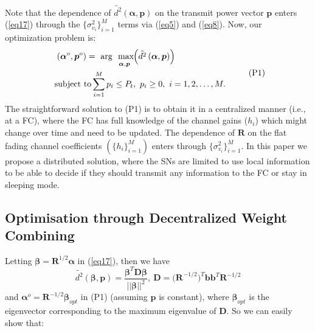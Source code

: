 \documentclass[conference]{IEEEtran}
\begin{document}
Note that the dependence of $\tilde{d^{2}}\left(\boldsymbol\alpha, \boldsymbol p \right)$ on the transmit power vector $\boldsymbol p$ enters (\ref{eq17}) through the $\displaystyle \big \{ \sigma^{2}_{v_i}\big \}_{i=1}^{M}$ terms via (\ref{eq5}) and (\ref{eq8}). 
Now, our optimization problem is:
\begin{equation*}\label{eq20}
\begin{aligned}
\hspace{0.25cm}\left(\boldsymbol \alpha^o, \boldsymbol p^o\right) =\  \underset{\hspace{0.6cm} \boldsymbol \alpha, \boldsymbol p}{\text{arg \ max}}
\hspace{-0.08cm}\left(\tilde{d^{2}}\left(\boldsymbol\alpha, \boldsymbol p \right)\right)  \ \ \ \  \ \ \ \ \ \  \ \ \ \ \ \ \ \ \ \  \\ \quad
\text{\hspace{-2cm}subject to} 
 \sum \limits_{i=1}^M p_i \leq P_t,  \ p_i\geq0,  \ i = 1, 2, \ldots, M. \hspace{0.25cm}
\end{aligned}
\tag{{P1}}
\end{equation*}
The straightforward solution to (P1) is to obtain it in a centralized manner (i.e., at a FC), where the FC  has full knowledge of the channel gains ($h_i$) which might change over time and need to be updated. The dependence of $\boldsymbol R$ on the flat fading channel coefficients $\left(\displaystyle \big \{ h_i\big \}_{i=1}^{M}\right)$ enters through $\displaystyle \big \{ \sigma^{2}_{v_i}\big \}_{i=1}^{M}$. In this paper we propose a distributed solution, where the SNs are limited to use local information to be able to decide if they should transmit any information to the FC or stay in sleeping mode. 
\subsection{Optimisation through Decentralized Weight Combining}
\label{sssec:subhead}
Letting $\boldsymbol\beta=\boldsymbol R^{1/2}\boldsymbol \alpha$ in (\ref{eq17}), then we have
\begin{equation}\label{eq3330}
\tilde{d^{2}}\left(\boldsymbol\beta, \boldsymbol p\right) = \frac{\boldsymbol\beta^T\boldsymbol D\boldsymbol  \beta}{ ||\boldsymbol \beta||^2},\ \boldsymbol D=\boldsymbol {(R_{}}^{-1/2})^T\boldsymbol b\boldsymbol b^{T}\boldsymbol R_{}^{-1/2}
\end {equation}
and $\boldsymbol \alpha^o=\boldsymbol R_{}^{-1/2}\boldsymbol \beta_{opt}$ in (P1) (assuming $\boldsymbol p$ is constant), where $\boldsymbol \beta_{opt}$ is the eigenvector corresponding to the maximum eigenvalue of $\boldsymbol D$. So we can easily show that:
\end{document}
